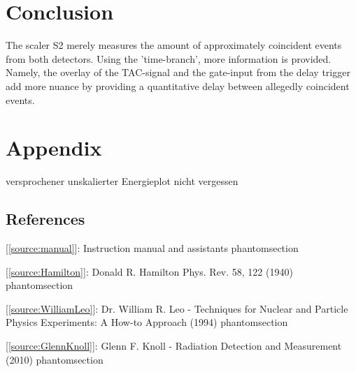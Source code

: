 \documentclass[a4paper,parskip,11pt, DIV12]{scrreprt}
\makeatletter
\newcommand{\labeltext}[2]{%
  \@bsphack
  \csname phantomsection\endcsname %
  \def\@currentlabel{#1}{\label{#2}}%
  \@esphack
}
\makeatother
\begin{document}
\chapter{Conclusion}

The scaler S2 merely measures the amount of approximately coincident events from both detectors. Using the 'time-branch', more information is provided. Namely, the overlay of the TAC-signal and the gate-input from the delay trigger add more nuance by providing a quantitative delay between allegedly coincident events.

\chapter{Appendix}

versprochener unskalierter Energieplot nicht vergessen

\section{References}

[\ref{source:manual}]: Instruction manual and assistants \labeltext{1}{source:manual}

[\ref{source:Hamilton}]: Donald R. Hamilton Phys. Rev. 58, 122 (1940) \labeltext{2}{source:Hamilton}

[\ref{source:WilliamLeo}]: Dr. William R. Leo - Techniques for Nuclear and Particle Physics Experiments: A How-to Approach (1994)\labeltext{3}{source:WilliamLeo}

[\ref{source:GlennKnoll}]: Glenn F. Knoll - Radiation Detection and Measurement (2010) \labeltext{4}{source:GlennKnoll}










\end{document}
